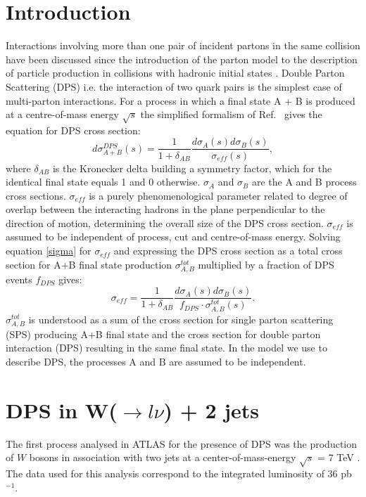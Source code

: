 \documentclass{ws-rv9x6}
\begin{document}
\section{Introduction}\label{ra_sec1}
Interactions involving more than one pair of incident partons in the same collision have been discussed since the introduction of the parton model to the description of particle production in collisions with hadronic initial states \cite{theory1,theory2}. Double Parton Scattering (DPS) i.e. the interaction of two quark pairs is the simplest case of multi-parton interactions. For a process in which a final state A + B is produced at a centre-of-mass energy $\sqrt{s}$ the simplified formalism of Ref.~ gives the equation for DPS cross section:
\begin{equation}
d\sigma^{DPS}_{A+B}(s) = \frac{1}{1+\delta_{AB}}\frac{d\sigma_A(s)d\sigma_B(s)}{\sigma_{e\!f\!f}(s)},
\label{sigma}
\end{equation}
where $\delta_{AB}$ is the Kronecker delta building a symmetry factor, which for the identical final state 
equals 1 and 0 otherwise.
$\sigma_{A}$ and $\sigma_{B}$ are the A and B process cross sections.  $\sigma_{e\!f\!f}$ is a purely phenomenological parameter related to degree of overlap between the interacting hadrons in the plane perpendicular to the direction of motion, determining the overall size of the DPS cross section. $\sigma_{e\!f\!f}$ is assumed to be independent of process, cut and centre-of-mass energy.
Solving  equation \ref{sigma} for $\sigma_{e\!f\!f}$ and expressing the DPS cross section as a total cross section for A+B final state production $\sigma_{A,B}^{tot}$ multiplied by a fraction of DPS events $f_{D\!P\!S}$ gives:
\begin{equation}
\sigma_{e\!f\!f} = \frac{1}{1+\delta_{AB}}\frac{d\sigma_A(s)d\sigma_B(s)}{f_{D\!P\!S}\cdot \sigma_{A,B}^{tot}(s)}.
\label{sigmaeff}
\end{equation}
$\sigma_{A,B}^{tot}$ is understood as a sum of the cross section for single parton scattering (SPS) producing A+B final state and the cross section for double parton interaction (DPS) resulting in the same final state. In the model we use to describe DPS, the processes A and B are assumed to be independent.
 
\section{DPS in W($\rightarrow l\nu$) + 2 jets}
\label{W}
The first process analysed in ATLAS for the presence of DPS was the production of $W$ bosons in association with two jets at a center-of-mass-energy $\sqrt s $ = 7 TeV \cite{dps1}. The data used for this analysis correspond to the integrated luminosity of 36 pb$^{-1}$.
\end{document}
